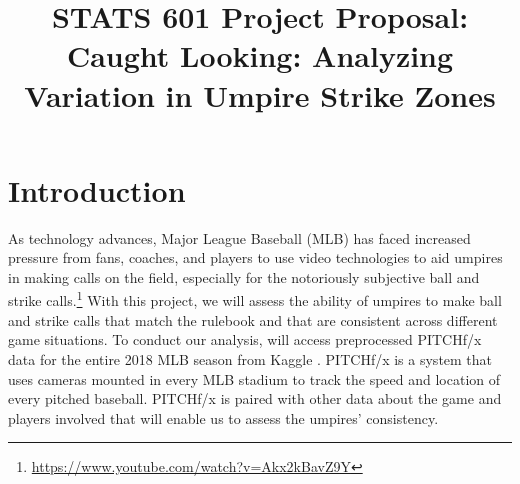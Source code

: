 \documentclass[bj, preprint]{imsart}
\begin{document}
\begin{frontmatter}

\title{{\Large STATS 601 Project Proposal:} \\ 
\bf Caught Looking: Analyzing Variation in Umpire Strike Zones}





\end{frontmatter}





\section{Introduction}\label{sec:intro}
As technology advances, Major League Baseball (MLB) has faced increased pressure from fans, coaches, and players to use video technologies to aid umpires in making calls on the field, especially for the notoriously subjective ball and strike calls.\footnote{\url{https://www.youtube.com/watch?v=Akx2kBavZ9Y}}
With this project, we will assess the ability of umpires to make ball and strike calls that match the rulebook and that are consistent across different game situations. 
To conduct our analysis, will access preprocessed PITCHf/x data for the entire 2018 MLB season from Kaggle \citep{schale2019mlb}. 
PITCHf/x is a system that uses cameras mounted in every MLB stadium to track the speed and location of every pitched baseball. 
PITCHf/x is paired with other data about the game and players involved that will enable us to assess the umpires' consistency.
\vspace{-1.5mm}
\end{document}
